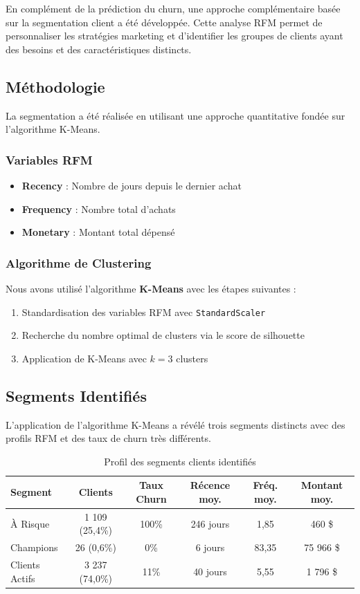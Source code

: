 \documentclass[12pt,a4paper]{article}
\begin{document}
En complément de la prédiction du churn, une approche complémentaire basée sur la segmentation client a été développée. Cette analyse RFM permet de personnaliser les stratégies marketing et d'identifier les groupes de clients ayant des besoins et des caractéristiques distincts.

\subsection{Méthodologie}

La segmentation a été réalisée en utilisant une approche quantitative fondée sur l'algorithme K-Means.

\subsubsection{Variables RFM}
\begin{itemize}
    \item \textbf{Recency} : Nombre de jours depuis le dernier achat
    \item \textbf{Frequency} : Nombre total d'achats
    \item \textbf{Monetary} : Montant total dépensé
\end{itemize}

\subsubsection{Algorithme de Clustering}
Nous avons utilisé l'algorithme \textbf{K-Means} avec les étapes suivantes :
\begin{enumerate}
    \item Standardisation des variables RFM avec \texttt{StandardScaler}
    \item Recherche du nombre optimal de clusters via le score de silhouette
    \item Application de K-Means avec $k=3$ clusters
\end{enumerate}

\subsection{Segments Identifiés}

L'application de l'algorithme K-Means a révélé trois segments distincts avec des profils RFM et des taux de churn très différents.

\begin{table}[H]
\centering
\begin{tabular}{L{3cm}ccccc}
\toprule
\textbf{Segment} & \textbf{Clients} & \textbf{Taux Churn} & \textbf{Récence moy.} & \textbf{Fréq. moy.} & \textbf{Montant moy.} \\
\midrule
À Risque & 1 109 (25,4\%) & 100\% & 246 jours & 1,85 & 460 \$ \\
Champions & 26 (0,6\%) & 0\% & 6 jours & 83,35 & 75 966 \$ \\
Clients Actifs & 3 237 (74,0\%) & 11\% & 40 jours & 5,55 & 1 796 \$ \\
\bottomrule
\end{tabular}
\caption{Profil des segments clients identifiés}
\end{table}
\end{document}
